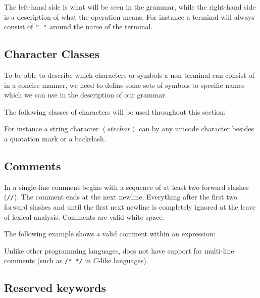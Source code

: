 The left-hand side is what will be seen in the grammar, while the right-hand
side is a description of what the operation means. For instance  a terminal will
always consist of $\texttt{" "}$ around the name of the terminal.

\subsection{Character Classes}
To be able to describe which characters or symbols a non-terminal can consist of
in a concise manner, we need to define some sets of symbols to specific names
which we can use in the description of our grammar.

The following classes of characters will be used throughout this section:

\begin{ebnf}
\end{ebnf}

For instance a string character $\left(strchar\right)$ can by any
unicode character besides a quotation mark or a backslash. 

\subsection{Comments}
\label{sec:comments}
In \productname{} a single-line comment begins with a sequence of at least two
forward slashes (\texttt{//}). The comment ends at the next newline. Everything
after the first two forward slashes and until the first next newline is
completely ignored at the leave of lexical analysis. Comments are valid
white space.

The following example shows a valid comment within an expression:


Unlike other programming languages, \productname{} does not have support for
multi-line comments (such as \texttt{/* */} in $C$-like languages).

\subsection{Reserved keywords}

